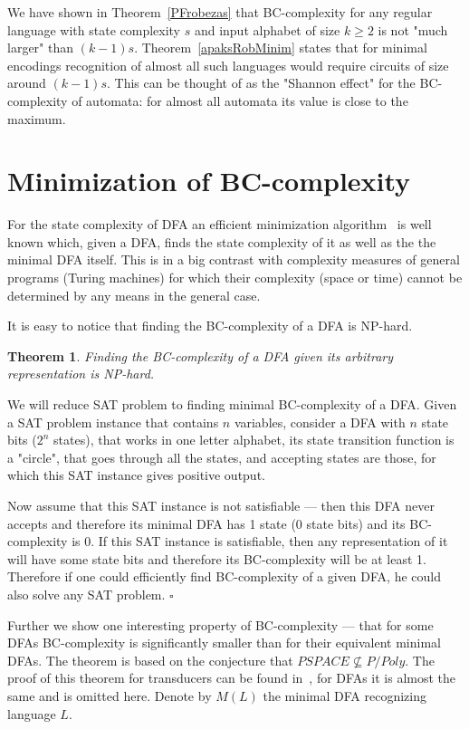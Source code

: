 \documentclass[copyright, creativecommons]{eptcs}
\newcommand{\qed}{$\square$}
\newtheorem{theorem}{Theorem}[section]
\newenvironment{proof}[1][Proof]{\begin{trivlist}
\item[\hskip \labelsep {\bfseries #1}]}{\end{trivlist}}
\begin{document}
We have shown in Theorem~\ref{PFrobezas} that BC-complexity for any regular language with state complexity $s$
and input alphabet of size $k\geq 2$ is not "much larger" than $(k-1)s$. Theorem~\ref{apaksRobMinim} states that for minimal
encodings recognition of almost all such languages would require circuits of size around $(k-1)s$. This can be thought of
as the "Shannon effect" for the BC-complexity of automata: for almost all automata its value is close
to the maximum.


\section{Minimization of BC-complexity}
\label{6nod}

For the state complexity of DFA an efficient minimization algorithm~\cite{H71} is well known which, given a DFA, finds
the state complexity of it as well as the the minimal DFA itself.
This is in a big contrast with complexity measures of general programs (Turing machines) for which their complexity
(space or time) cannot be determined by any means in the general case.

It is easy to notice that finding the BC-complexity of a DFA is NP-hard.
\begin{theorem}
Finding the BC-complexity of a DFA given its arbitrary representation is NP-hard.
\end{theorem}
\begin{proof}
We will reduce SAT problem to finding minimal BC-complexity of a DFA. Given a SAT problem instance that contains $n$ variables,
consider a DFA with $n$ state bits ($2^n$ states), that works in one letter alphabet, its state transition
function is a "circle", that goes through all the states, and accepting states are those, for which this SAT
instance gives positive output.

Now assume that this SAT instance is not satisfiable --- then this DFA never accepts and therefore its minimal DFA
has 1 state (0 state bits) and its BC-complexity is 0. If this SAT instance
is satisfiable, then any representation of it  will have some state bits and therefore its BC-complexity will be at least 1.
Therefore if one could efficiently find BC-complexity of a given DFA, he could also solve any SAT problem.
\qed
\end{proof}

Further we show one interesting property of BC-complexity --- that
for some DFAs  BC-complexity is significantly smaller than for
their equivalent minimal DFAs. 
The theorem is based on the conjecture that $PSPACE\not\subseteq P/Poly$.
The proof of this theorem for transducers can be found in~\cite{V11}, for DFAs it is almost the same and is omitted here.
Denote by $M(L)$ the minimal DFA recognizing language $L$.
\end{document}
